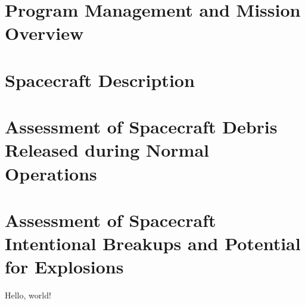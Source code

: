 \documentclass{report}
\begin{document}
\tableofcontents


\section{Program Management and Mission Overview}

\section{Spacecraft Description}

\section{Assessment of Spacecraft Debris Released during Normal Operations}

\section{Assessment of Spacecraft Intentional Breakups and Potential for Explosions}

Hello, world!
\end{document}
